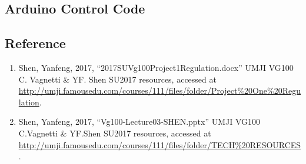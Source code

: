 \subsection{Arduino Control Code}
\singlespacing



\newpage
\normalsize
\subsection{Reference}
\begin{enumerate}
\item Shen, Yanfeng, 2017, “2017SUVg100Project1Regulation.docx” UMJI VG100 C. Vagnetti \& YF. Shen SU2017 resources, accessed at \url{http://umji.famousedu.com/courses/111/files/folder/Project%20One%20Regulation}.
\item Shen, Yanfeng, 2017, “Vg100-Lecture03-SHEN.pptx” UMJI VG100 C.Vagnetti \& YF.Shen SU2017 resources, accessed at \url{http://umji.famousedu.com/courses/111/files/folder/TECH%20RESOURCES}.
\end{enumerate}